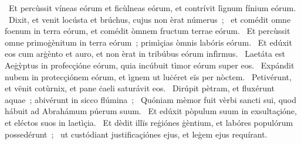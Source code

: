 ~Et percùssit víneas eórum et ficùlneas eórum, et contrívit lìgnum fínium eórum. 
~Dixit, et venit locústa et brúchus, cujus non èrat númerus~; 
~et comédit omne foenum in terra eórum, et comédit òmnem fructum terrae eórum. 
~Et percùssit omne primoġènitum in terra eórum~; primìçias òmnis labóris eórum. 
~Et edúxit eos cum arġènto et auro, et non èrat in tribúbus eórum infìrmus. 
~Laetáta est Aeġỳptus in profecçióne eórum, quia incúbuit tìmor eórum super eos. 
~Expándit nubem in protecçiónem eórum, et ìgnem ut luċéret eïs per nòctem. 
~Petivérunt, et vënit cotùrnix, et pane ċaeli saturávit eos. 
~Dirúpit pètram, et fluxérunt aquae~; abivérunt in sicco flúmina~; 
~Quóniam mèmor fuit vèrbi sancti sui, quod hábuit ad Abrahámum púerum suum. 
~Et edúxit pòpulum suum in exsultaçióne, et eléctos suos in laetìçia. 
~Et dèdit illïs reġiónes ġèntium, et labóres populórum possedérunt~; 
~ut custódiant justificaçiónes ejus, et leġem ejus requírant. 
